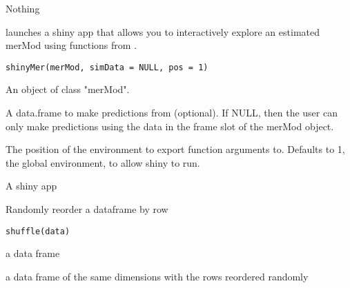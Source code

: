 \documentclass[letterpaper]{book}
\begin{document}
%
\begin{Value}
Nothing
\end{Value}
%
\begin{Description}\relax
{} launches a shiny app that allows you to interactively
explore an estimated merMod using functions from .
\end{Description}
%
\begin{Usage}
\begin{verbatim}
shinyMer(merMod, simData = NULL, pos = 1)
\end{verbatim}
\end{Usage}
%
\begin{Arguments}
\begin{ldescription}
\item[\code{merMod}] An object of class "merMod".

\item[\code{simData}] A data.frame to make predictions from (optional). If
NULL, then the user can only make predictions using the data in
the frame slot of the merMod object.

\item[\code{pos}] The position of the environment to export function arguments to.
Defaults to 1, the global environment, to allow shiny to run.
\end{ldescription}
\end{Arguments}
%
\begin{Value}
A shiny app
\end{Value}
%
\begin{Description}\relax
Randomly reorder a dataframe by row
\end{Description}
%
\begin{Usage}
\begin{verbatim}
shuffle(data)
\end{verbatim}
\end{Usage}
%
\begin{Arguments}
\begin{ldescription}
\item[\code{data}] a data frame
\end{ldescription}
\end{Arguments}
%
\begin{Value}
a data frame of the same dimensions with the rows reordered
randomly
\end{Value}
\end{document}
